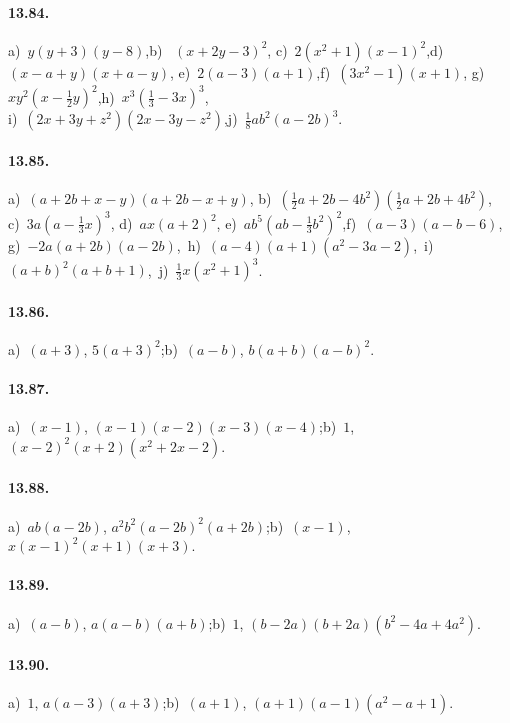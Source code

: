 \paragraph{13.84.} a)~$y(y+3)(y-8)$,\quad b)~ $(x+2y-3)^{2}$,\quad
c)~$2(x^{2}+1)(x-1)^{2}$,\quad d)~$(x-a+y)(x+a-y)$,\quad
e)~$2(a-3)(a+1)$,\quad f)~$(3x^{2}-1)(x+1)$,\quad
g)~$xy^{2}(x-\frac{1}{2}y)^{2}$,\quad h)~$x^{3}\left(\frac{1}{3}-3x\right)^{3}$,\protect\\
i)~$(2x+3y+z^{2})(2x-3y-z^{2})$,\quad j)~$\frac{1}{8}{ab}^{2}(a-2b)^{3}$.

\paragraph{13.85.} a)~$(a+2b+x-y)(a+2b-x+y)$,\quad 
b)~$\left(\frac{1}{2}a+2b-4b^{2}\right)\left(\frac{1}{2}a+2b+4b^{2}\right)$,\protect\\
c)~$3a\left(a-\frac{1}{3}x\right)^{3}$,\quad
d)~$ax(a+2)^{2}$,\quad
e)~${ab}^{5}\left({ab}-\frac{1}{3}b^{2}\right)^{2}$,\quad f)~$(a-3)(a-b-6)$,\protect\\
g)~$-2a(a+2b)(a-2b)$,\,
h)~$(a-4)(a+1)(a^{2}-3a-2)$,\,
i)~$(a+b)^{2}(a+b+1)$,\, j)~$\frac{1}{3}x(x^{2}+1)^{3}$.

\paragraph{13.86.}
a)~$(a+3)$, $5(a+3)^2$;\quad b)~$(a-b)$, $b(a+b)(a-b)^2$.

\paragraph{13.87.}
a)~$(x-1)$, $(x-1)(x-2)(x-3)(x-4)$;\quad b)~$1$, $(x-2)^2(x+2)\left(x^2+2x-2\right)$.

\paragraph{13.88.}
a)~$ab(a-2b)$, $a^2 b^2(a-2b)^2(a+2b)$;\quad b)~$(x-1)$, $x(x-1)^2(x+1)(x+3)$.

\paragraph{13.89.}
a)~$(a-b)$, $a(a-b)(a+b)$;\quad b)~$1$, $(b-2a)(b+2a)\left(b^2-4a+4a^2\right)$.

\paragraph{13.90.}
a)~$1$, $a(a-3)(a+3)$;\quad b)~$(a+1)$, $(a+1)(a-1)\left(a^2-a+1\right)$.

